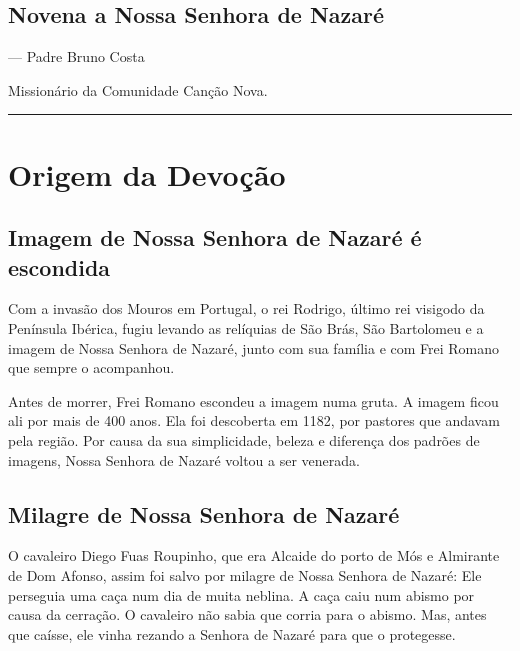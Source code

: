 \documentclass[a4paper,14pt]{extarticle} \usepackage[utf8]{inputenc}
\begin{document}
\subsection*{Novena a Nossa Senhora de Nazaré}



\begin{flushright}
--- Padre Bruno Costa 

Missionário da Comunidade Canção Nova.

\end{flushright}

\par\noindent\rule{\textwidth}{0.4pt}


\tableofcontents
\thispagestyle{empty}

\newpage

\section{Origem da Devoção}

\subsection{Imagem de Nossa Senhora de Nazaré é escondida}

Com a invasão dos Mouros em Portugal, o rei Rodrigo, último rei visigodo da Península Ibérica, fugiu levando as relíquias de São Brás, São Bartolomeu e a imagem de Nossa Senhora de Nazaré, junto com sua família e com Frei Romano que sempre o acompanhou.

Antes de morrer, Frei Romano escondeu a imagem numa gruta. A imagem ficou ali por mais de 400 anos. Ela foi descoberta em 1182, por pastores que andavam pela região. Por causa da sua simplicidade, beleza e diferença dos padrões de imagens, Nossa Senhora de Nazaré voltou a ser venerada.

\subsection{Milagre de Nossa Senhora de Nazaré}

O cavaleiro Diego Fuas Roupinho, que era Alcaide do porto de Mós e Almirante de Dom Afonso, assim foi salvo por milagre de Nossa Senhora de Nazaré: Ele perseguia uma caça num dia de muita neblina. A caça caiu num abismo por causa da cerração. O cavaleiro não sabia que corria para o abismo. Mas, antes que caísse, ele vinha rezando a Senhora de Nazaré para que o protegesse.
\end{document}
